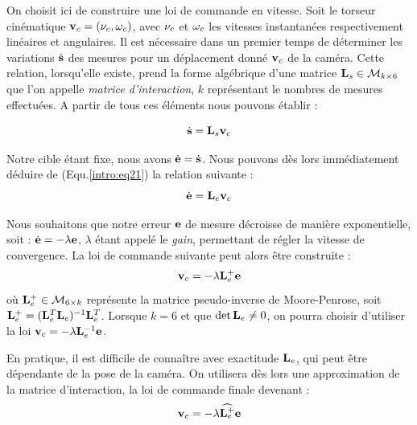 On choisit ici de construire une loi de commande en vitesse. Soit le torseur cinématique ${\bf v}_c = ({\bf \nu}_c, {\bf \omega}_c)$, avec ${\bf \nu}_c$ et ${\bf \omega}_c$ les vitesses instantanées respectivement linéaires et angulaires. Il est nécessaire dans un premier temps de déterminer les variations $\dot {\bf s}$ des mesures pour un déplacement donné ${\bf v}_c$ de la caméra. Cette relation, lorsqu'elle existe, prend la forme algébrique d'une matrice ${\bf L}_s \in \mathcal M_{k\times 6}$ que l'on appelle {\it matrice d'interaction}, $k$ représentant le nombres de mesures effectuées. A partir de tous ces éléments nous pouvons établir :

\begin{equation}
\dot {\bf s} = {\bf L}_s {\bf v}_c
\label{intro:eq21}
\end{equation}

Notre cible étant fixe, nous avons $\dot {\bf e} = \dot {\bf s}$. Nous pouvons dès lors immédiatement déduire de (Equ.\ref{intro:eq21}) la relation suivante :
\begin{equation}
\dot {\bf e} = {\bf L}_e {\bf v}_c
\label{intro:eq22}
\end{equation}

Nous souhaitons que notre erreur ${\bf e}$ de mesure décroisse de manière exponentielle, soit : $\dot {\bf e} = - \lambda {\bf e}$, $\lambda$ étant appelé le {\it gain}, permettant de régler la vitesse de convergence. La loi de commande suivante peut alors être construite :
\begin{equation}
{\bf v}_c = - \lambda {\bf L}_e^+ {\bf e} 
\label{intro:eq23}
\end{equation}
où ${\bf L}_e^+ \in \mathcal M_{6 \times k}$ représente la matrice pseudo-inverse de Moore-Penrose, soit ${\bf L}_e^+ = ({\bf L}_e^T {\bf L}_e)^{-1} {\bf L}_e^T$. Lorsque $k = 6$ et que $\det {\bf L}_e \neq 0$, on pourra choisir d'utiliser la loi ${\bf v}_c = - \lambda {\bf L}_e^{-1} {\bf e} $.

En pratique, il est difficile de connaître avec exactitude ${\bf L}_e$, qui peut être dépendante de la pose de la caméra. On utilisera dès lors une approximation de la matrice d'interaction, la loi de commande finale devenant :
\begin{equation}
{\bf v}_c = - \lambda \widehat {{\bf L}_e^+} {\bf e} 
\label{intro:eq24}
\end{equation}

